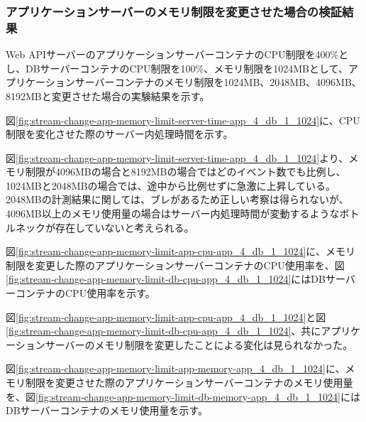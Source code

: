 \documentclass[../../../../main]{subfiles}
\begin{document}
    \subsubsection{アプリケーションサーバーのメモリ制限を変更させた場合の検証結果}\label{subsubsec:result-streaming-change-app-memory}

    Web APIサーバーのアプリケーションサーバーコンテナのCPU制限を400\%とし、DBサーバーコンテナのCPU制限を100\%、メモリ制限を1024MBとして、アプリケーションサーバーコンテナのメモリ制限を1024MB、2048MB、4096MB、8192MBと変更させた場合の実験結果を示す。


    図\ref{fig:stream-change-app-memory-limit-server-time-app_4_db_1_1024}に、CPU制限を変化させた際のサーバー内処理時間を示す。

    

    図\ref{fig:stream-change-app-memory-limit-server-time-app_4_db_1_1024}より、メモリ制限が4096MBの場合と8192MBの場合ではどのイベント数でも比例し、1024MBと2048MBの場合では、途中から比例せずに急激に上昇している。2048MBの計測結果に関しては、ブレがあるため正しい考察は得られないが、4096MB以上のメモリ使用量の場合はサーバー内処理時間が変動するようなボトルネックが存在していないと考えられる。


    図\ref{fig:stream-change-app-memory-limit-app-cpu-app_4_db_1_1024}に、メモリ制限を変更した際のアプリケーションサーバーコンテナのCPU使用率を、図\ref{fig:stream-change-app-memory-limit-db-cpu-app_4_db_1_1024}にはDBサーバーコンテナのCPU使用率を示す。

    


    

    図\ref{fig:stream-change-app-memory-limit-app-cpu-app_4_db_1_1024}と図\ref{fig:stream-change-app-memory-limit-db-cpu-app_4_db_1_1024}、共にアプリケーションサーバーのメモリ制限を変更したことによる変化は見られなかった。


    図\ref{fig:stream-change-app-memory-limit-app-memory-app_4_db_1_1024}に、メモリ制限を変更させた際のアプリケーションサーバーコンテナのメモリ使用量を、図\ref{fig:stream-change-app-memory-limit-db-memory-app_4_db_1_1024}にはDBサーバーコンテナのメモリ使用量を示す。
\end{document}
